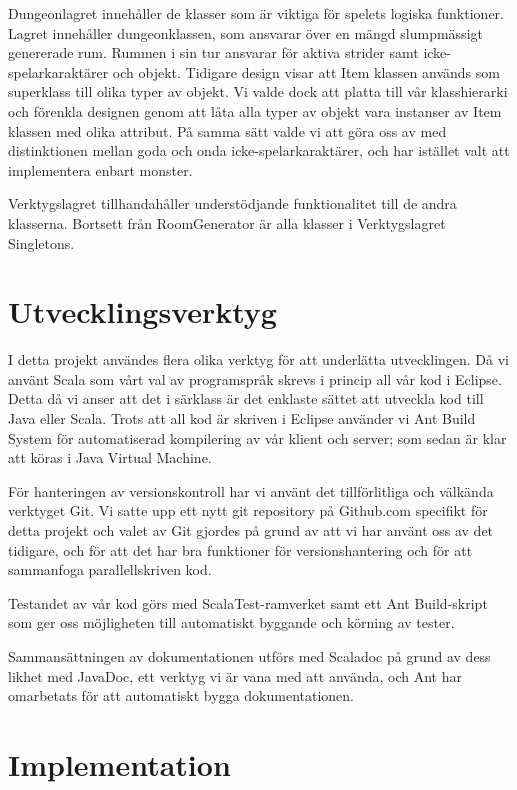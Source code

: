 \documentclass[a4paper]{article}
\begin{document}
Dungeonlagret innehåller de klasser som är viktiga för spelets logiska funktioner. Lagret innehåller dungeonklassen, som ansvarar över en mängd slumpmässigt genererade rum. Rummen i sin tur ansvarar för aktiva strider samt icke-spelarkaraktärer och objekt. Tidigare design visar att Item klassen används som superklass till olika typer av objekt. Vi valde dock att platta till vår klasshierarki och förenkla designen genom att låta alla typer av objekt vara instanser av Item klassen med olika attribut. På samma sätt valde vi att göra oss av med distinktionen mellan goda och onda icke-spelarkaraktärer, och har istället valt att implementera enbart monster.

Verktygslagret tillhandahåller understödjande funktionalitet till de andra klasserna. Bortsett från RoomGenerator är alla klasser i Verktygslagret Singletons. 


\section{Utvecklingsverktyg}

I detta projekt användes flera olika verktyg för att underlätta utvecklingen. Då vi använt Scala som vårt val av programspråk skrevs i princip all vår kod i Eclipse. Detta då vi anser att det i särklass är det enklaste sättet att utveckla kod till Java eller Scala. Trots att all kod är skriven i Eclipse använder vi Ant Build System 
för automatiserad kompilering av vår klient och server; som sedan är klar att köras i Java Virtual Machine. 

För hanteringen av versionskontroll har vi använt det tillförlitliga och välkända verktyget Git. Vi satte upp ett nytt git repository på Github.com specifikt för detta projekt och valet av Git gjordes på grund av att vi har använt oss av det tidigare, och för att det har bra funktioner för versionshantering och för att sammanfoga parallellskriven kod. 

Testandet av vår kod görs med ScalaTest-ramverket samt ett Ant Build-skript som ger oss möjligheten till automatiskt byggande och körning av tester.

Sammansättningen av dokumentationen utförs med Scaladoc på grund av dess likhet med JavaDoc, ett verktyg vi är vana med att använda, och Ant har omarbetats för att automatiskt bygga dokumentationen.

\section{Implementation}
\end{document}
